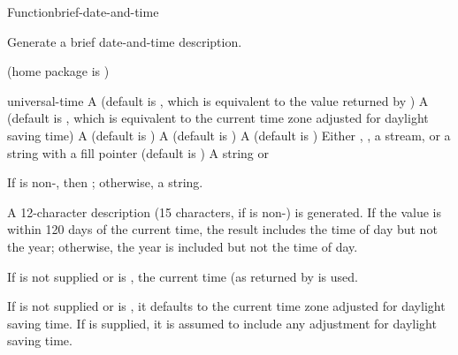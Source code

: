 \documentclass[10pt,twoside,english,pdftex]{article}
\begin{document}
\begin{functiondoc}{Function}{brief-date-and-time}{%
    }
% 
% 

\fnsyntax

\fnpurpose Generate a brief date-and-time description.

\fnpackage {} (home package is )

\fnmodule {}

\fnargs
\begin{args}{universal-time}
 A  (default is \nil,
  which is equivalent to the value returned by
  )
 A  (default is \nil,
  which is equivalent to the current time zone adjusted for daylight
  saving time)
 A  (default is 
  )
 A  (default is
)
 A  (default is \nil)
\arg[destination] Either \nil, , a stream, or a string with a fill 
pointer (default is \nil)
\arg[result] A string or \nil{}
\end{args}

\fnreturns If  is non-\nil, then \nil; otherwise, a string.

\fndescription A 12-character description (15 characters, if
 is non-\nil{}) is generated.  If the
 value is within 120 days of the current time,
the result  includes the time of day but not the year;
otherwise, the year is included but not the time of day.

\W{} 
%
%
If  is not supplied or is \nil, the current time
(as returned by  is used.

\W{} 
%
If  is not supplied or is \nil, it defaults to the
current time zone adjusted for daylight saving time. If
 is supplied, it is assumed to include any adjustment
for daylight saving time.


\end{functiondoc}
\end{document}

